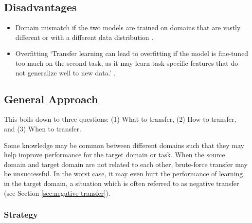 \documentclass[11pt]{article}
\begin{document}
\subsection{Disadvantages}

\begin{itemize}
    \item Domain mismatch if the two models are trained on domains that are vastly different or with a different data distribution \cite{geeks-transfer-learning}.
    \item Overfitting `Transfer learning can lead to overfitting if the model is fine-tuned too much on the second task, as it may learn task-specific features that do not generalize well to new data.' \cite{geeks-transfer-learning}.
\end{itemize}

\subsection{General Approach}

This boils down to three questions: (1) What to transfer, (2) How to transfer, and (3) When to transfer.

Some knowledge may be common between different domains such that they may help improve performance for the target domain or task. When the source domain and target domain are not related to each other, brute-force transfer may be unsuccessful. In the worst case, it may even hurt the performance of learning in the target domain, a situation which is often referred to as negative transfer (see Section \ref{sec:negative-transfer}).

\subsubsection{Strategy}
\end{document}
